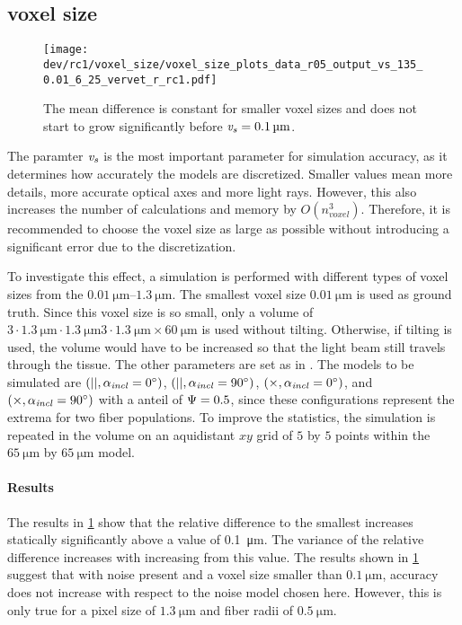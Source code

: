 \subsection{voxel size \texorpdfstring{\voxels{}}{}}
%
%
\begin{figure}[!t]%
\centering
\texttt{[image: dev/rc1/voxel\_size/voxel\_size\_plots\_data\_r05\_output\_vs\_135\_0.01\_6\_25\_vervet\_r\_rc1.pdf]}
\caption[voxel size model with noise]{The mean difference is constant for smaller voxel sizes and does not start to grow significantly before $\voxels=\SI{0.1}{\micro\meter}$.}
\label{fig:voxelsizeNoise}
\end{figure}
%
The \voxelsize{} paramter $\textnormal{$\mathit{v_{s}}$}$ is the most important parameter for simulation accuracy, as it determines how accurately the models are discretized.
Smaller values mean more details, more accurate optical axes and more light rays.
However, this also increases the number of calculations and memory by $O(n_{\mathit{voxel}}^3)$.
Therefore, it is recommended to choose the voxel size as large as possible without introducing a significant error due to the discretization.
\par
%
To investigate this effect, a simulation is performed with different types of voxel sizes from the $\SIrange{0.01}{1.3}{\micro\meter}$.
The smallest voxel size $\SI{0.01}{\micro\meter}$ is used as ground truth.
Since this voxel size is so small, only a volume of $3 \cdot \SI{1.3}{\micro\meter} \cdot \SI{1.3}{\micro\meter} 3 \cdot \SI{1.3}{\micro\meter} \times \SI{60}{\micro\meter}$ is used without tilting.
Otherwise, if tilting is used, the volume would have to be increased so that the light beam still travels through the tissue.
The other parameters are set as in \dummy{}.
The models to be simulated are $(||,\textnormal{$\alpha_{\mathit{incl}}$} = \SI{0}{\degree})$, $(||,\textnormal{$\alpha_{\mathit{incl}}$} = \SI{90}{\degree})$, $(\times,\textnormal{$\alpha_{\mathit{incl}}$} = \SI{0}{\degree})$, and $(\times,\textnormal{$\alpha_{\mathit{incl}}$} = \SI{90}{\degree})$ with a anteil of $\textnormal{$\Psi$} = \SI{0.5}{}$, since these configurations represent the extrema for two fiber populations.
To improve the statistics, the simulation is repeated in the volume on an aquidistant $xy$ grid of $\num{5}$ by $\num{5}$ points within the $\SI{65}{\micro\meter}$ by $\SI{65}{\micro\meter}$ model.
%
\paragraph{Results}
The results in \cref{fig:voxelsizeNoise} show that the relative difference to the smallest \voxelsize{} increases statically significantly above a value of \SI{0.1}{\micro\meter}.
The variance of the relative difference increases with increasing \voxelsize{} from this value.
%
The results shown in \cref{fig:voxelsizeNoise} suggest that with noise present and a voxel size smaller than $\SI{0.1}{\micro\meter}$, accuracy does not increase with respect to the noise model chosen here.
However, this is only true for a pixel size of $\SI{1.3}{\micro\meter}$ and fiber radii of $\SI{0.5}{\micro\meter}$.
% 
%
%
